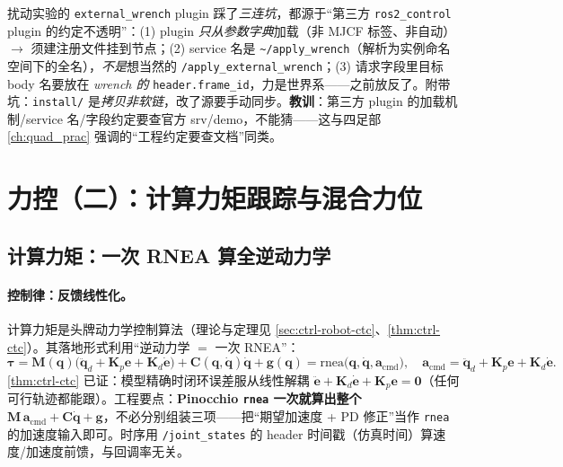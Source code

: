 \begin{pitfall}\label{pit:ap-plugin}
扰动实验的 \texttt{external\_wrench} plugin 踩了\emph{三连坑}，都源于“第三方 \texttt{ros2\_control} plugin 的约定不透明”：(1) plugin \emph{只从参数字典}加载（非 MJCF 标签、非自动）$\to$ 须建注册文件挂到节点；(2) service 名是 \texttt{\textasciitilde/\allowbreak apply\_wrench}（解析为实例命名空间下的全名），\emph{不是}想当然的 \texttt{/\allowbreak apply\_external\_wrench}；(3) 请求字段里目标 body 名要放在 \emph{wrench 的} \texttt{header.\allowbreak frame\_id}，力是世界系——之前放反了。附带坑：\texttt{install/} 是\emph{拷贝非软链}，改了源要手动同步。\textbf{教训}：第三方 plugin 的加载机制/service 名/字段约定要查官方 srv/demo，不能猜——这与四足部 \cref{ch:quad_prac} 强调的“工程约定要查文档”同类。
\end{pitfall}

\section{力控（二）：计算力矩跟踪与混合力位}
\label{sec:ap-ctc}

\subsection{计算力矩：一次 RNEA 算全逆动力学}
\label{sec:ap-computed-torque}

\paragraph{控制律：反馈线性化。}
计算力矩是头牌动力学控制算法（理论与定理见 \cref{sec:ctrl-robot-ctc}、\cref{thm:ctrl-ctc}）。其落地形式利用“逆动力学 $=$ 一次 RNEA”：
\begin{equation}
  \boxed{\boldsymbol{\tau}=\mathbf{M}(\mathbf{q})\big(\ddot{\mathbf{q}}_d+\mathbf{K}_p\mathbf{e}+\mathbf{K}_d\dot{\mathbf{e}}\big)+\mathbf{C}(\mathbf{q},\dot{\mathbf{q}})\dot{\mathbf{q}}+\mathbf{g}(\mathbf{q})=\mathrm{rnea}\big(\mathbf{q},\dot{\mathbf{q}},\mathbf{a}_{\mathrm{cmd}}\big),}
  \quad \mathbf{a}_{\mathrm{cmd}}=\ddot{\mathbf{q}}_d+\mathbf{K}_p\mathbf{e}+\mathbf{K}_d\dot{\mathbf{e}}.
  \label{eq:ap-ctc}
\end{equation}
\cref{thm:ctrl-ctc} 已证：模型精确时闭环误差服从线性解耦 $\ddot{\mathbf{e}}+\mathbf{K}_d\dot{\mathbf{e}}+\mathbf{K}_p\mathbf{e}=\mathbf{0}$（任何可行轨迹都能跟）。工程要点：\textbf{Pinocchio \texttt{rnea} 一次就算出整个 $\mathbf{M}\,\mathbf{a}_{\mathrm{cmd}}+\mathbf{C}\dot{\mathbf{q}}+\mathbf{g}$}，不必分别组装三项——把“期望加速度 + PD 修正”当作 \texttt{rnea} 的加速度输入即可。时序用 \texttt{/\allowbreak joint\_states} 的 header 时间戳（仿真时间）算速度/加速度前馈，与回调率无关。

